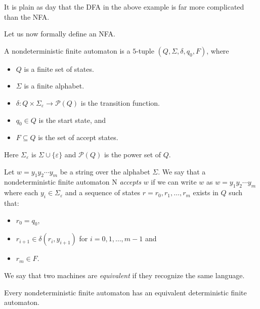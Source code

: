 It is plain as day that the DFA in the above example is far more complicated than the NFA.

Let us now formally define an NFA.
\begin{definition}
A nondeterministic finite automaton is a $5$-tuple $(Q,\Sigma,\delta,q_0,F)$, where
\begin{itemize}
    \item $Q$ is a finite set of states.
    \item $\Sigma$ is a finite alphabet.
    \item $\delta:Q\times\Sigma_\varepsilon\to\mathcal{P}(Q)$ is the transition function.
    \item $q_0\in Q$ is the start state, and
    \item $F\subseteq Q$ is the set of accept states.
\end{itemize}
\end{definition}

Here $\Sigma_\varepsilon$ is $\Sigma\cup\{\varepsilon\}$ and $\mathcal{P}(Q)$ is the power set of $Q$.

\vspace{3mm}
Let $w=y_1y_2\cdots y_m$ be a string over the alphabet $\Sigma$. We say that a nondeterministic finite automaton N \textit{accepts} $w$ if we can write $w$ as $w=y_1y_2\cdots y_m$ where each $y_i\in\Sigma_\varepsilon$ and a sequence of states $r=r_0,r_1,\ldots,r_m$ exists in $Q$ such that:
\begin{itemize}
    \item $r_0=q_0$,
    \item $r_{i+1}\in\delta(r_i, y_{i+1})$ for $i=0,1,\ldots,m-1$ and
    \item $r_m\in F$.
\end{itemize}

\begin{definition}
We say that two machines are \textit{equivalent} if they recognize the same language.
\end{definition}
\begin{theorem}
Every nondeterministic finite automaton has an equivalent deterministic finite automaton.
\end{theorem}

